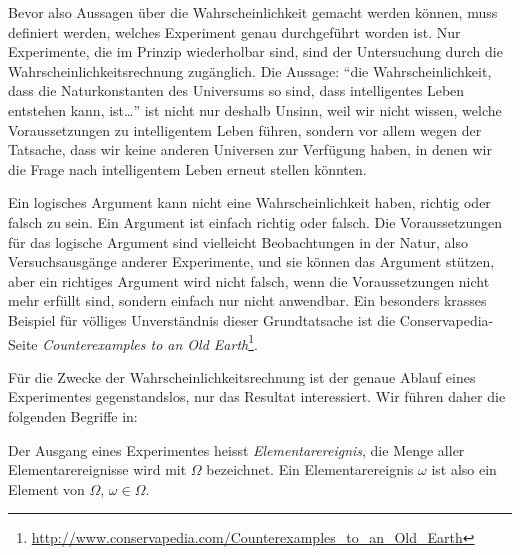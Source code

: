 Bevor also Aussagen über die Wahrscheinlichkeit gemacht werden können,
muss definiert werden, welches Experiment genau durchgeführt worden ist.
Nur Experimente, die im Prinzip wiederholbar sind, sind der Untersuchung
durch die Wahrscheinlichkeitsrechnung zugänglich.
Die Aussage: ``die Wahrscheinlichkeit, dass die Naturkonstanten des
Universums so sind, dass intelligentes Leben entstehen kann, ist\dots''
ist nicht nur deshalb Unsinn, weil wir nicht wissen, welche
Voraussetzungen zu intelligentem Leben führen, sondern vor allem wegen
der Tatsache, dass wir keine anderen Universen zur Verfügung haben, in denen
wir die Frage nach intelligentem Leben erneut stellen könnten.

Ein logisches Argument kann nicht eine Wahrscheinlichkeit haben,
richtig oder falsch zu sein.
Ein Argument ist einfach richtig oder falsch.
Die Voraussetzungen für das logische Argument sind vielleicht Beobachtungen
in der Natur, also Versuchsausgänge anderer Experimente, und sie
können das Argument stützen, aber ein richtiges Argument wird nicht
falsch, wenn die Voraussetzungen nicht mehr erfüllt sind, sondern einfach
nur nicht anwendbar.
Ein besonders krasses Beispiel für völliges Unverständnis
dieser Grundtatsache ist die Conservapedia-Seite {\em Counterexamples
to an Old Earth}\footnote{\url{http://www.conservapedia.com/Counterexamples\_to\_an\_Old\_Earth}}.

Für die Zwecke der Wahrscheinlichkeitsrechnung ist der genaue Ablauf
eines Experimentes gegenstandslos, nur das Resultat interessiert.
Wir führen daher die folgenden Begriffe in:

\begin{definition}
Der Ausgang eines Experimentes heisst {\em Elementarereignis}, die
Menge aller Elementarereignisse wird mit $\Omega$ bezeichnet.
Ein Elementarereignis $\omega$ ist also ein Element von $\Omega$,
$\omega\in\Omega$.
\end{definition}

